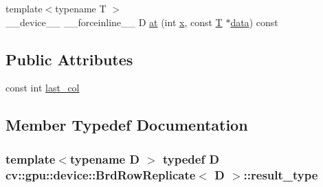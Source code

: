 \begin{DoxyCompactItemize}
\item 
{\footnotesize template$<$typename T $>$ }\\\-\_\-\-\_\-device\-\_\-\-\_\- \-\_\-\-\_\-forceinline\-\_\-\-\_\- D \hyperlink{structcv_1_1gpu_1_1device_1_1BrdRowReplicate_a14f4ae04f499044a554888ce48695134}{at} (int \hyperlink{highgui__c_8h_a6150e0515f7202e2fb518f7206ed97dc}{x}, const \hyperlink{calib3d_8hpp_a3efb9551a871ddd0463079a808916717}{T} $\ast$\hyperlink{legacy_8hpp_ab9fe6c09e6d02865a953fffc12fe6ca0}{data}) const 
\end{DoxyCompactItemize}
\subsection*{Public Attributes}
\begin{DoxyCompactItemize}
\item 
const int \hyperlink{structcv_1_1gpu_1_1device_1_1BrdRowReplicate_a00d59184467b791a35bd04e8f7be8c81}{last\-\_\-col}
\end{DoxyCompactItemize}


\subsection{Member Typedef Documentation}
\hypertarget{structcv_1_1gpu_1_1device_1_1BrdRowReplicate_a9f820c457dd75df4aaa76321cab4196b}{
\subsubsection[{result\-\_\-type}]{\setlength{\rightskip}{0pt plus 5cm}template$<$typename D $>$ typedef D {\bf cv\-::gpu\-::device\-::\-Brd\-Row\-Replicate}$<$ D $>$\-::{\bf result\-\_\-type}}}\label{structcv_1_1gpu_1_1device_1_1BrdRowReplicate_a9f820c457dd75df4aaa76321cab4196b}


